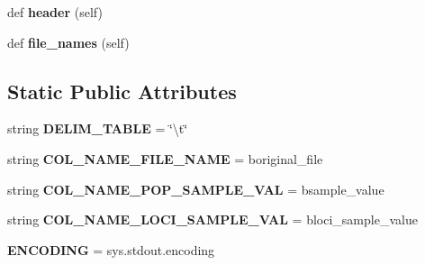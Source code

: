 \begin{DoxyCompactItemize}
\item 
def {\bfseries header} (self)\hypertarget{classnegui_1_1pgutilityclasses_1_1NeEstimationTableFileManager_a04084c17c84f4eeb4fd19c09d37f393d}{}\label{classnegui_1_1pgutilityclasses_1_1NeEstimationTableFileManager_a04084c17c84f4eeb4fd19c09d37f393d}

\item 
def {\bfseries file\+\_\+names} (self)\hypertarget{classnegui_1_1pgutilityclasses_1_1NeEstimationTableFileManager_a91fe93736ed19dca48cd2aebf877a16c}{}\label{classnegui_1_1pgutilityclasses_1_1NeEstimationTableFileManager_a91fe93736ed19dca48cd2aebf877a16c}

\end{DoxyCompactItemize}
\subsection*{Static Public Attributes}
\begin{DoxyCompactItemize}
\item 
string {\bfseries D\+E\+L\+I\+M\+\_\+\+T\+A\+B\+LE} = \char`\"{}\textbackslash{}t\char`\"{}\hypertarget{classnegui_1_1pgutilityclasses_1_1NeEstimationTableFileManager_a02e6313e73e671a34cbf297be25986e5}{}\label{classnegui_1_1pgutilityclasses_1_1NeEstimationTableFileManager_a02e6313e73e671a34cbf297be25986e5}

\item 
string {\bfseries C\+O\+L\+\_\+\+N\+A\+M\+E\+\_\+\+F\+I\+L\+E\+\_\+\+N\+A\+ME} = b\textquotesingle{}original\+\_\+file\textquotesingle{}\hypertarget{classnegui_1_1pgutilityclasses_1_1NeEstimationTableFileManager_aeb9f745120d31aecd0e88793cd2d6e89}{}\label{classnegui_1_1pgutilityclasses_1_1NeEstimationTableFileManager_aeb9f745120d31aecd0e88793cd2d6e89}

\item 
string {\bfseries C\+O\+L\+\_\+\+N\+A\+M\+E\+\_\+\+P\+O\+P\+\_\+\+S\+A\+M\+P\+L\+E\+\_\+\+V\+AL} = b\textquotesingle{}sample\+\_\+value\textquotesingle{}\hypertarget{classnegui_1_1pgutilityclasses_1_1NeEstimationTableFileManager_a24e95337ee6224feb5641170b5f85230}{}\label{classnegui_1_1pgutilityclasses_1_1NeEstimationTableFileManager_a24e95337ee6224feb5641170b5f85230}

\item 
string {\bfseries C\+O\+L\+\_\+\+N\+A\+M\+E\+\_\+\+L\+O\+C\+I\+\_\+\+S\+A\+M\+P\+L\+E\+\_\+\+V\+AL} = b\textquotesingle{}loci\+\_\+sample\+\_\+value\textquotesingle{}\hypertarget{classnegui_1_1pgutilityclasses_1_1NeEstimationTableFileManager_a58fefd886a37a462c7ecd125000b3075}{}\label{classnegui_1_1pgutilityclasses_1_1NeEstimationTableFileManager_a58fefd886a37a462c7ecd125000b3075}

\item 
{\bfseries E\+N\+C\+O\+D\+I\+NG} = sys.\+stdout.\+encoding\hypertarget{classnegui_1_1pgutilityclasses_1_1NeEstimationTableFileManager_a1ae6257a1d70f5c02934c6c278af4c16}{}\label{classnegui_1_1pgutilityclasses_1_1NeEstimationTableFileManager_a1ae6257a1d70f5c02934c6c278af4c16}

\end{DoxyCompactItemize}


